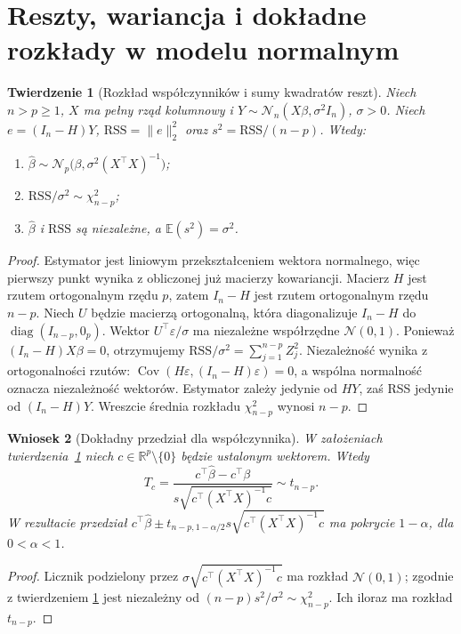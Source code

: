 \documentclass[11pt,a4paper,oneside]{report}
\numberwithin{equation}{chapter}
\theoremstyle{plain}
\newtheorem{twierdzenie}{Twierdzenie}[chapter]
\newtheorem{wniosek}[twierdzenie]{Wniosek}
\theoremstyle{definition}
\theoremstyle{remark}
\newcommand{\R}{\mathbb R}
\newcommand{\E}{\mathbb E}
\newcommand{\Cov}{\operatorname{Cov}}
\begin{document}
\section{Reszty, wariancja i dokładne rozkłady w modelu normalnym}
\begin{twierdzenie}[Rozkład współczynników i sumy kwadratów reszt]
\label{thm:ols-gaussian}
Niech $n>p\ge1$, $X$ ma pełny rząd kolumnowy i
$Y\sim\mathcal N_n(X\beta,\sigma^2I_n)$, $\sigma>0$.
Niech $e=(I_n-H)Y$, $\mathrm{RSS}=\|e\|_2^2$ oraz
$s^2=\mathrm{RSS}/(n-p)$. Wtedy:
\begin{enumerate}
\item $\widehat\beta\sim\mathcal N_p\!\bigl(\beta,
 \sigma^2(X^\top X)^{-1}\bigr)$;
\item $\mathrm{RSS}/\sigma^2\sim\chi^2_{n-p}$;
\item $\widehat\beta$ i $\mathrm{RSS}$ są niezależne,
 a $\E(s^2)=\sigma^2$.
\end{enumerate}
\end{twierdzenie}
\begin{proof}
Estymator jest liniowym przekształceniem wektora normalnego,
więc pierwszy punkt wynika z obliczonej już macierzy kowariancji.
Macierz $H$ jest rzutem ortogonalnym rzędu $p$, zatem
$I_n-H$ jest rzutem ortogonalnym rzędu $n-p$.
Niech $U$ będzie macierzą ortogonalną, która diagonalizuje
$I_n-H$ do $\operatorname{diag}(I_{n-p},0_p)$.
Wektor $U^\top\varepsilon/\sigma$ ma niezależne
współrzędne $\mathcal N(0,1)$. Ponieważ
$(I_n-H)X\beta=0$, otrzymujemy
$\mathrm{RSS}/\sigma^2=\sum_{j=1}^{n-p}Z_j^2$.
Niezależność wynika z ortogonalności rzutów:
$\Cov(H\varepsilon,(I_n-H)\varepsilon)=0$,
a wspólna normalność oznacza niezależność wektorów.
Estymator zależy jedynie od $HY$, zaś RSS jedynie od
$(I_n-H)Y$. Wreszcie średnia rozkładu
$\chi^2_{n-p}$ wynosi $n-p$.
\end{proof}

\begin{wniosek}[Dokładny przedział dla współczynnika]
\label{cor:ols-ci}
W założeniach twierdzenia~\ref{thm:ols-gaussian}
niech $c\in\R^p\setminus\{0\}$ będzie ustalonym
wektorem. Wtedy
\[
 T_c=\frac{c^\top\widehat\beta-c^\top\beta}
 {s\sqrt{c^\top(X^\top X)^{-1}c}}\sim t_{n-p}.
\]
W rezultacie przedział
$c^\top\widehat\beta\pm t_{n-p,1-\alpha/2}
 s\sqrt{c^\top(X^\top X)^{-1}c}$
ma pokrycie $1-\alpha$, dla $0<\alpha<1$.
\end{wniosek}
\begin{proof}
Licznik podzielony przez
$\sigma\sqrt{c^\top(X^\top X)^{-1}c}$ ma rozkład
$\mathcal N(0,1)$; zgodnie z twierdzeniem
\ref{thm:ols-gaussian} jest niezależny od
$(n-p)s^2/\sigma^2\sim\chi^2_{n-p}$.
Ich iloraz ma rozkład $t_{n-p}$.
\end{proof}
\end{document}
